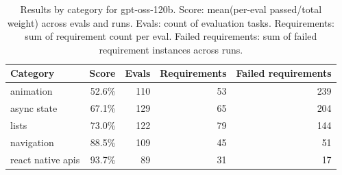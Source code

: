 \begin{table}[htbp]
\centering
\begin{tabular}{lrrrr}
\toprule
Category & Score & Evals & Requirements & Failed requirements \\
\midrule
animation & 52.6\% & 110 & 53 & 239 \\
async state & 67.1\% & 129 & 65 & 204 \\
lists & 73.0\% & 122 & 79 & 144 \\
navigation & 88.5\% & 109 & 45 & 51 \\
react native apis & 93.7\% & 89 & 31 & 17 \\
\bottomrule
\end{tabular}
\caption{Results by category for gpt-oss-120b. Score: mean(per-eval passed/total weight) across evals and runs. Evals: count of evaluation tasks. Requirements: sum of requirement count per eval. Failed requirements: sum of failed requirement instances across runs.}
\end{table}
